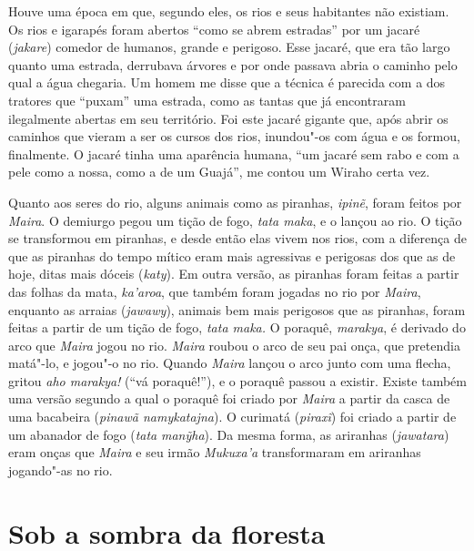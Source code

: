 Houve uma época em que, segundo eles, os rios e seus habitantes não
existiam. Os rios e igarapés foram abertos ``como se abrem estradas'' por
um jacaré (\emph{jakare}) comedor de humanos, grande e perigoso. Esse
jacaré, que era tão largo quanto uma estrada, derrubava árvores e por
onde passava abria o caminho pelo qual a água chegaria. Um homem me
disse que a técnica é parecida com a dos tratores que ``puxam'' uma
estrada, como as tantas que já encontraram ilegalmente abertas em seu
território. Foi este jacaré gigante que, após abrir os caminhos que
vieram a ser os cursos dos rios, inundou"-os com água e os formou,
finalmente. O jacaré tinha uma aparência humana, ``um jacaré sem rabo e
com a pele como a nossa, como a de um Guajá'', me contou um Wiraho certa
vez.

Quanto aos seres do rio, alguns animais como as piranhas, \emph{ipinẽ},
foram feitos por \emph{Maira}. O demiurgo pegou um tição de fogo,
\emph{tata maka}, e o lançou ao rio. O tição se transformou em piranhas,
e desde então elas vivem nos rios, com a diferença de que as piranhas do
tempo mítico eram mais agressivas e perigosas dos que as de hoje, ditas
mais dóceis (\emph{katy}). Em outra versão, as piranhas foram feitas a
partir das folhas da mata, \emph{ka'aroa}, que também foram jogadas no
rio por \emph{Maira}, enquanto as arraias (\emph{jawawy}), animais bem
mais perigosos que as piranhas, foram feitas a partir de um tição de
fogo, \emph{tata maka.} O poraquê, \emph{marakya}, é derivado do arco
que \emph{Maira} jogou no rio. \emph{Maira} roubou o arco de seu pai
onça, que pretendia matá"-lo, e jogou"-o no rio. Quando \emph{Maira}
lançou o arco junto com uma flecha, gritou \emph{aho marakya!} (``vá
poraquê!''), e o poraquê passou a existir. Existe também uma versão
segundo a qual o poraquê foi criado por \emph{Maira} a partir da casca de uma
bacabeira (\emph{pinawã namykatajna}). O curimatá (\emph{piraxĩ}) foi
criado a partir de um abanador de fogo (\emph{tata} \emph{manỹha}). Da
mesma forma, as ariranhas (\emph{jawatara}) eram onças que \emph{Maira}
e seu irmão \emph{Mukuxa'a} transformaram em ariranhas jogando"-as no
rio.

\section{Sob a sombra da floresta }\label{sob-a-sombra-da-floresta}

